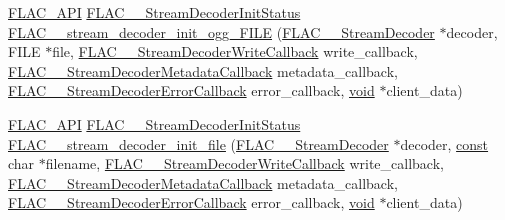 \begin{DoxyCompactItemize}
\item 
\hyperlink{group__flac__export_ga56ca07df8a23310707732b1c0007d6f5}{F\+L\+A\+C\+\_\+\+A\+PI} \hyperlink{group__flac__stream__decoder_gaaed54a24ac6310d29c5cafba79759c44}{F\+L\+A\+C\+\_\+\+\_\+\+Stream\+Decoder\+Init\+Status} \hyperlink{group__flac__stream__decoder_gac6a35b1db07e057ec9912f637b37dd74}{F\+L\+A\+C\+\_\+\+\_\+stream\+\_\+decoder\+\_\+init\+\_\+ogg\+\_\+\+F\+I\+LE} (\hyperlink{struct_f_l_a_c_____stream_decoder}{F\+L\+A\+C\+\_\+\+\_\+\+Stream\+Decoder} $\ast$decoder, F\+I\+LE $\ast$file, \hyperlink{group__flac__stream__decoder_ga61e48dc2c0d2f6c5519290ff046874a4}{F\+L\+A\+C\+\_\+\+\_\+\+Stream\+Decoder\+Write\+Callback} write\+\_\+callback, \hyperlink{group__flac__stream__decoder_ga6aa87c01744c1c601b7f371f627b6e14}{F\+L\+A\+C\+\_\+\+\_\+\+Stream\+Decoder\+Metadata\+Callback} metadata\+\_\+callback, \hyperlink{group__flac__stream__decoder_gac896ee6a12668e9015fab4fbc6aae996}{F\+L\+A\+C\+\_\+\+\_\+\+Stream\+Decoder\+Error\+Callback} error\+\_\+callback, \hyperlink{png_8h_ac9c84fa68bbad002983e35ce3663c686}{void} $\ast$client\+\_\+data)
\item 
\hyperlink{group__flac__export_ga56ca07df8a23310707732b1c0007d6f5}{F\+L\+A\+C\+\_\+\+A\+PI} \hyperlink{group__flac__stream__decoder_gaaed54a24ac6310d29c5cafba79759c44}{F\+L\+A\+C\+\_\+\+\_\+\+Stream\+Decoder\+Init\+Status} \hyperlink{group__flac__stream__decoder_ga1692108a97012d1c5f79baf7df012c33}{F\+L\+A\+C\+\_\+\+\_\+stream\+\_\+decoder\+\_\+init\+\_\+file} (\hyperlink{struct_f_l_a_c_____stream_decoder}{F\+L\+A\+C\+\_\+\+\_\+\+Stream\+Decoder} $\ast$decoder, \hyperlink{zconf_8h_a2c212835823e3c54a8ab6d95c652660e}{const} char $\ast$filename, \hyperlink{group__flac__stream__decoder_ga61e48dc2c0d2f6c5519290ff046874a4}{F\+L\+A\+C\+\_\+\+\_\+\+Stream\+Decoder\+Write\+Callback} write\+\_\+callback, \hyperlink{group__flac__stream__decoder_ga6aa87c01744c1c601b7f371f627b6e14}{F\+L\+A\+C\+\_\+\+\_\+\+Stream\+Decoder\+Metadata\+Callback} metadata\+\_\+callback, \hyperlink{group__flac__stream__decoder_gac896ee6a12668e9015fab4fbc6aae996}{F\+L\+A\+C\+\_\+\+\_\+\+Stream\+Decoder\+Error\+Callback} error\+\_\+callback, \hyperlink{png_8h_ac9c84fa68bbad002983e35ce3663c686}{void} $\ast$client\+\_\+data)
\item 

\end{DoxyCompactItemize}
